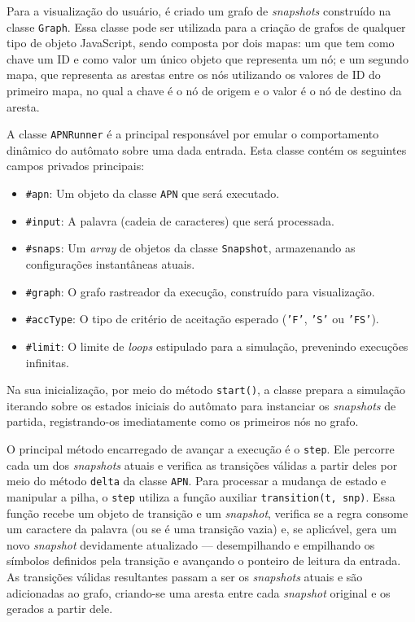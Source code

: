 Para a visualização do usuário, é criado um grafo de \emph{snapshots} construído na classe \texttt{Graph}. Essa classe pode ser utilizada para a criação de grafos de qualquer tipo de objeto JavaScript, sendo composta por dois mapas: um que tem como chave um ID e como valor um único objeto que representa um nó; e um segundo mapa, que representa as arestas entre os nós utilizando os valores de ID do primeiro mapa, no qual a chave é o nó de origem e o valor é o nó de destino da aresta.

A classe \texttt{APNRunner} é a principal responsável por emular o comportamento dinâmico do autômato sobre uma dada entrada. Esta classe contém os seguintes campos privados principais:
\begin{itemize}
   \item \texttt{\#apn}: Um objeto da classe \texttt{APN} que será executado.
   \item \texttt{\#input}: A palavra (cadeia de caracteres) que será processada.
   \item \texttt{\#snaps}: Um \emph{array} de objetos da classe \texttt{Snapshot}, armazenando as configurações instantâneas atuais.
   \item \texttt{\#graph}: O grafo rastreador da execução, construído para visualização.
   \item \texttt{\#accType}: O tipo de critério de aceitação esperado (\texttt{'F'}, \texttt{'S'} ou \texttt{'FS'}).
   \item \texttt{\#limit}: O limite de \emph{loops} estipulado para a simulação, prevenindo execuções infinitas.
\end{itemize}

Na sua inicialização, por meio do método \texttt{start()}, a classe prepara a simulação iterando sobre os estados iniciais do autômato para instanciar os \emph{snapshots} de partida, registrando-os imediatamente como os primeiros nós no grafo.

O principal método encarregado de avançar a execução é o \texttt{step}. Ele percorre cada um dos \emph{snapshots} atuais e verifica as transições válidas a partir deles por meio do método \texttt{delta} da classe \texttt{APN}. Para processar a mudança de estado e manipular a pilha, o \texttt{step} utiliza a função auxiliar \texttt{transition(t, snp)}. Essa função recebe um objeto de transição e um \emph{snapshot}, verifica se a regra consome um caractere da palavra (ou se é uma transição vazia) e, se aplicável, gera um novo \emph{snapshot} devidamente atualizado — desempilhando e empilhando os símbolos definidos pela transição e avançando o ponteiro de leitura da entrada. As transições válidas resultantes passam a ser os \emph{snapshots} atuais e são adicionadas ao grafo, criando-se uma aresta entre cada \emph{snapshot} original e os gerados a partir dele.

